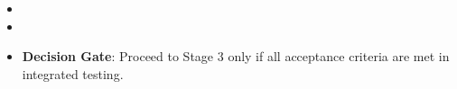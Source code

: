 \begin{itemize}
        \begin{itemize}
            \item Interface misalignment under thermal cycling.
            \item Seal degradation or leakage.
            \item Electrical connection fatigue or corrosion.
            \item Load transfer inducing binding or stress concentrations.
        \end{itemize}
    \item \item \item \textbf{Decision Gate}: Proceed to Stage 3 only if all acceptance criteria are met in integrated testing.
\end{itemize}

